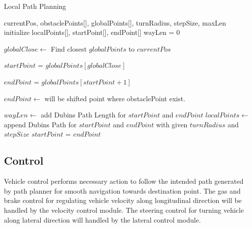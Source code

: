 \documentclass[10 pt,a4paper,conference]{IEEEtran}
\begin{document}
\begin{algorithm}
      \scriptsize

      \caption{Local Path Planning}
      \label{alg_local_waypoints}
      \begin{algorithmic}[1]
          \REQUIRE currentPos, obstaclePoints[], globalPoints[], turnRadius, stepSize, maxLen
            \STATE initialize localPoints[], startPoint[], endPoint[] 
            \STATE wayLen = 0
            
            \STATE $globalClose \leftarrow$ Find closest $globalPoints$ to $currentPos$ 
            
            \STATE $startPoint$ = $globalPoints[globalClose]$           
            
                
                \STATE $endPoint$ = $globalPoints[startPoint + 1]$
            
                \STATE $endPoint \leftarrow$ will be shifted point where obstaclePoint exist. 
                \ENDIF                  
                
                \STATE $wayLen \leftarrow$ add Dubins Path Length for $startPoint$ and $endPoint$
                \STATE $localPoints \leftarrow$ append Dubins Path for $startPoint$ and $endPoint$ with given $turnRadius$ and $stepSize$
                \STATE $startPoint$ = $endPoint$
            \ENDWHILE
            
      \end{algorithmic}
\end{algorithm}

\subsection{Control}\label{control}

Vehicle control performs necessary action to follow the intended path
generated by path planner for smooth navigation towards destination
point. The gas and brake control for regulating vehicle velocity along
longitudinal direction will be handled by the velocity control module.
The steering control for turning vehicle along lateral direction will
handled by the lateral control module.
\end{document}
